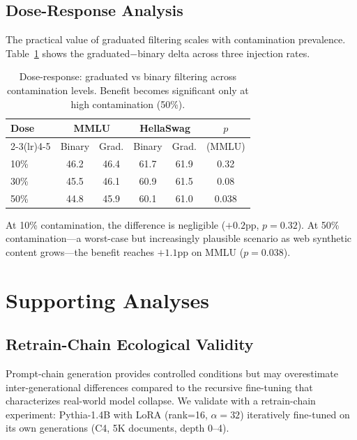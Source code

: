 \documentclass[11pt,a4paper]{article}
\begin{document}
\subsection{Dose-Response Analysis}
\label{sec:dose}

The practical value of graduated filtering scales with contamination prevalence.
Table~\ref{tab:dose} shows the graduated$-$binary delta across three injection rates.

\begin{table}[t]
\centering
\small
\caption{Dose-response: graduated vs binary filtering across contamination levels. Benefit becomes significant only at high contamination (50\%).}
\label{tab:dose}
\begin{tabular}{lccccc}
\toprule
\textbf{Dose} & \multicolumn{2}{c}{\textbf{MMLU}} & \multicolumn{2}{c}{\textbf{HellaSwag}} & $p$ \\
\cmidrule(lr){2-3}\cmidrule(lr){4-5}
 & Binary & Grad. & Binary & Grad. & (MMLU) \\
\midrule
10\% & 46.2 & 46.4 & 61.7 & 61.9 & 0.32 \\
30\% & 45.5 & 46.1 & 60.9 & 61.5 & 0.08 \\
50\% & 44.8 & 45.9 & 60.1 & 61.0 & 0.038 \\
\bottomrule
\end{tabular}
\end{table}

At 10\% contamination, the difference is negligible ($+0.2$pp, $p=0.32$).
At 50\% contamination---a worst-case but increasingly plausible scenario as web synthetic content grows---the benefit reaches $+1.1$pp on MMLU ($p=0.038$).

\section{Supporting Analyses}
\label{sec:supporting}

\subsection{Retrain-Chain Ecological Validity}
\label{sec:retrain}

Prompt-chain generation provides controlled conditions but may overestimate inter-generational differences compared to the recursive fine-tuning that characterizes real-world model collapse.
We validate with a retrain-chain experiment: Pythia-1.4B with LoRA (rank=16, $\alpha=32$) iteratively fine-tuned on its own generations (C4, 5K documents, depth 0--4).
\end{document}
